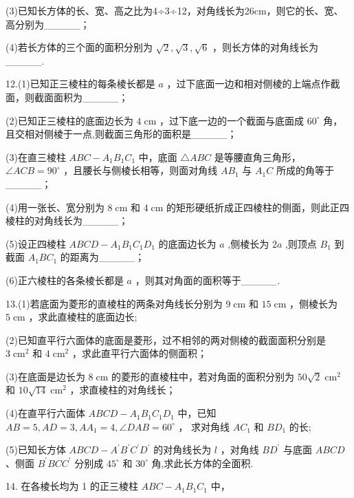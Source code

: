 \documentclass[10pt]{article}
\begin{document}
(3)已知长方体的长、宽、高之比为4÷3÷12，对角线长为26cm，则它的长、宽、高分别为\_\_\_\_\_；

(4)若长方体的三个面的面积分别为 \(\sqrt{2},\sqrt{3},\sqrt{6}\) ，则长方体的对角线长为\_\_\_\_\_.

12.(1)已知正三棱柱的每条棱长都是 \(a\) ，过下底面一边和相对侧棱的上端点作截面，则截面面积为\_\_\_\_\_；

(2)已知正三棱柱的底面边长为 \(4\mathrm{\;{cm}}\) ，过下底一边的一个截面与底面成 \({60}^{ \circ  }\) 角，且交相对侧棱于一点,则截面三角形的面积是\_\_\_\_\_；

(3)在直三棱柱 \({ABC} - {A}_{1}{B}_{1}{C}_{1}\) 中，底面 \(\bigtriangleup  {ABC}\) 是等腰直角三角形， \(\angle {ACB} = {90}^{ \circ  }\) ，且腰长与侧棱长相等，则面对角线 \(A{B}_{1}\) 与 \({A}_{1}C\) 所成的角等于\_\_\_\_\_；

(4)用一张长、宽分别为 \(8\mathrm{\;{cm}}\) 和 \(4\mathrm{\;{cm}}\) 的矩形硬纸折成正四棱柱的侧面，则此正四棱柱的对角线长为\_\_\_\_\_；

(5)设正四棱柱 \({ABCD} - {A}_{1}{B}_{1}{C}_{1}{D}_{1}\) 的底面边长为 \(a\) ,侧棱长为 \({2a}\) ,则顶点 \({B}_{1}\) 到截面 \({A}_{1}B{C}_{1}\) 的距离为\_\_\_\_\_；

(6)正六棱柱的各条棱长都是 \(a\) ，则其对角面的面积等于\_\_\_\_\_.

13.(1)若底面为菱形的直棱柱的两条对角线长分别为 \(9\mathrm{\;{cm}}\) 和 \({15}\mathrm{\;{cm}}\) ，侧棱长为 \(5\mathrm{\;{cm}}\) ，求此直棱柱的底面边长;

(2)已知直平行六面体的底面是菱形，过不相邻的两对侧棱的截面面积分别是 \(3{\mathrm{\;{cm}}}^{2}\) 和 \(4{\mathrm{\;{cm}}}^{2}\) ，求此直平行六面体的侧面积；

(3)在底面是边长为 \(8\mathrm{\;{cm}}\) 的菱形的直棱柱中，若对角面的面积分别为 \({50}\sqrt{2}{\mathrm{\;{cm}}}^{2}\) 和 \({10}\sqrt{14}{\mathrm{\;{cm}}}^{2}\) ，求直棱柱的对角线长；

(4)在直平行六面体 \({ABCD} - {A}_{1}{B}_{1}{C}_{1}{D}_{1}\) 中，已知 \({AB} = 5,{AD} = 3,{A{A}_{1}} = 4,\angle {DAB} = {60}^{ \circ  }\) ， 求对角线 \(A{C}_{1}\) 和 \(B{D}_{1}\) 的长;

(5)已知长方体 \({ABCD} - {A}^{\prime }{B}^{\prime }{C}^{\prime }{D}^{\prime }\) 的对角线长为 \(l\) ，对角线 \(B{D}^{\prime }\) 与底面 \({ABCD}\) 、侧面 \({B}^{\prime }{BC}{C}^{\prime }\) 分别成 \({45}^{ \circ  }\) 和 \({30}^{ \circ  }\) 角,求此长方体的全面积.

14. 在各棱长均为 1 的正三棱柱 \({ABC} - {A}_{1}{B}_{1}{C}_{1}\) 中，
\end{document}
